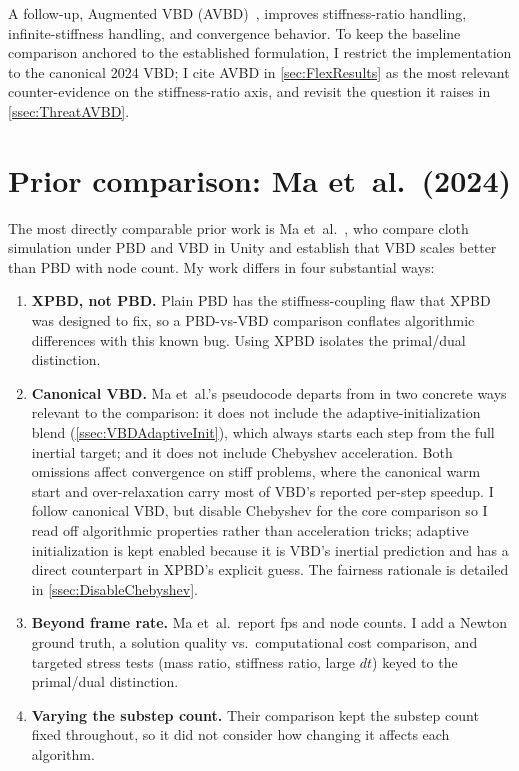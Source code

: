 A follow-up, Augmented VBD (AVBD)~\cite{Giles2025}, improves stiffness-ratio
handling, infinite-stiffness handling, and convergence behavior. To keep the
baseline comparison anchored to the established formulation, I restrict the
implementation to the canonical 2024 VBD; I cite AVBD in
\autoref{sec:FlexResults} as the most relevant counter-evidence on the
stiffness-ratio axis, and revisit the question it raises in
\autoref{ssec:ThreatAVBD}.

\section{Prior comparison: Ma et~al.\ (2024)}
\label{sec:Ma2024}
The most directly comparable prior work is Ma et~al.~\cite{app142311072}, who
compare cloth simulation under PBD and VBD in Unity and establish that VBD scales
better than PBD with node count. My work differs in four substantial ways:
\begin{enumerate}
    \item \textbf{XPBD, not PBD.} Plain PBD has the stiffness-coupling flaw that
        XPBD was designed to fix, so a PBD-vs-VBD comparison conflates algorithmic
        differences with this known bug. Using XPBD isolates the primal/dual
        distinction.
    \item \textbf{Canonical VBD.} Ma et~al.'s pseudocode departs from
        \cite{Chen2024} in two concrete ways relevant to the comparison: it does
        not include the adaptive-initialization blend
        (\autoref{ssec:VBDAdaptiveInit}), which always starts each step from the
        full inertial target; and it does not include Chebyshev acceleration.
        Both omissions affect convergence on stiff problems, where the canonical
        warm start and over-relaxation carry most of VBD's reported per-step
        speedup. I follow canonical VBD, but disable Chebyshev for the core
        comparison so I read off algorithmic properties rather than acceleration
        tricks; adaptive initialization is kept enabled because it is VBD's
        inertial prediction and has a direct counterpart in XPBD's explicit
        guess. The fairness rationale is detailed in
        \autoref{ssec:DisableChebyshev}.
    \item \textbf{Beyond frame rate.} Ma et~al.\ report fps and node counts. I add
        a Newton ground truth, a solution quality vs.\ computational cost comparison,
        and targeted stress tests (mass ratio, stiffness ratio, large $dt$) keyed to the
        primal/dual distinction.
    \item \textbf{Varying the substep count.} Their comparison kept the substep
        count fixed throughout, so it did not consider how changing it affects each
        algorithm.
\end{enumerate}

